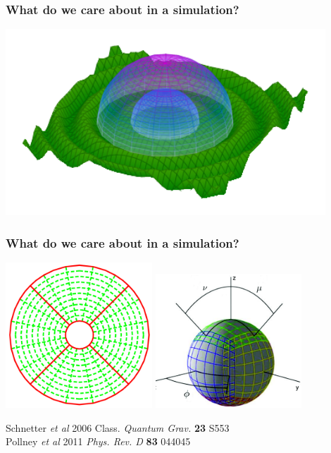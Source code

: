\documentclass[]{beamer}
\begin{document}
\begin{frame}
  \frametitle{What do we care about in a simulation?}
  \begin{center}
    \includegraphics[width=12cm]{figures/wavey}
  \end{center}
\end{frame}

\begin{frame}
  \frametitle{What do we care about in a simulation?}
    \begin{center}
    \includegraphics[width=5.5cm]{figures/fourpatches.png}
    \includegraphics[width=5.5cm]{figures/sixpatches.png}
  \end{center}
  Schnetter \textit{et al} 2006 Class. \textit{Quantum Grav.} \textbf{23} S553\\
  Pollney \textit{et al} 2011 \textit{Phys. Rev. D} \textbf{83} 044045
\end{frame}
\end{document}
